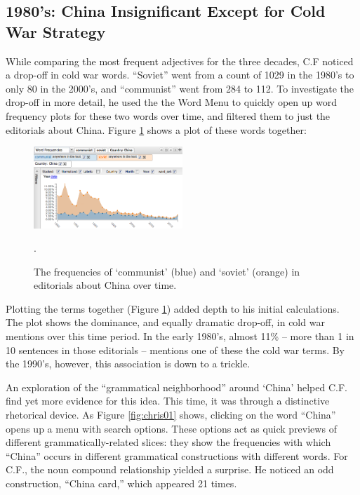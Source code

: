 \documentclass{sig-alternate}
\begin{document}
\subsection{1980's: China Insignificant Except for Cold War Strategy}
While comparing the most frequent adjectives for the three decades, C.F noticed a drop-off in cold war words. ``Soviet''  went from  a count of 1029 in the 1980's to only 80 in the 2000's, and ``communist'' went from 284 to 112.   To investigate the drop-off in more detail, he used the the Word Menu to quickly open up word frequency plots for these two words over time, and filtered them to just the editorials about China.  Figure \ref{fig:chris04b} shows a plot of these words together:

\begin{figure}[h!]
\includegraphics[width=0.5\textwidth]{fig/chris/04b.png}
\caption{The frequencies of `communist' (blue) and `soviet' (orange) in editorials about China over time. \label{fig:chris04b}}.
\end{figure}

Plotting the terms together (Figure \ref{fig:chris04b}) added depth to his initial calculations.  The plot shows the dominance, and equally dramatic drop-off, in cold war mentions over this time period. In the early 1980's, almost 11\% -- more than 1 in 10 sentences in those editorials -- mentions one of these the cold war terms. By the 1990's, however, this association is down to a trickle. 

An exploration of the ``grammatical neighborhood'' around `China'  helped C.F. find yet more evidence for this idea. This time, it was through a distinctive rhetorical device. As Figure \ref{fig:chris01} shows, clicking on the word ``China'' opens up a menu with search options. These options act as quick previews of different grammatically-related slices: they show the frequencies with which ``China'' occurs in different grammatical constructions with different words.  For C.F., the noun compound relationship yielded a surprise. He noticed an odd construction, ``China card,'' which appeared 21 times.
\end{document}
